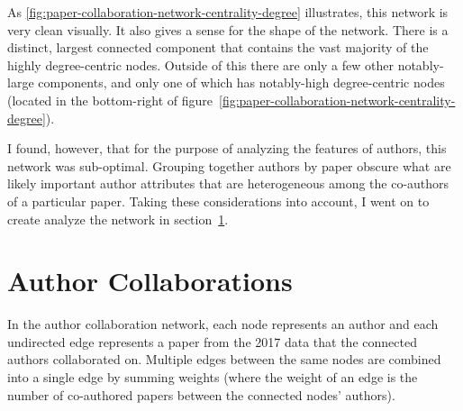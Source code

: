 \documentclass{article}
\begin{document}
As \ref{fig:paper-collaboration-network-centrality-degree} illustrates, this network is very clean visually.
It also gives a sense for the shape of the network.
There is a distinct, largest connected component that contains the vast majority of the highly degree-centric nodes.
Outside of this there are only a few other notably-large components, and only one of which has notably-high degree-centric nodes (located in the bottom-right of figure~\ref{fig:paper-collaboration-network-centrality-degree}).

I found, however, that for the purpose of analyzing the features of authors, this network was sub-optimal.
Grouping together authors by paper obscure what are likely important author attributes that are heterogeneous among the co-authors of a particular paper. Taking these considerations into account, I went on to create analyze the network in section~\ref{sec:author-collaboration}.

\section{Author Collaborations}
\label{sec:author-collaboration}

In the author collaboration network, each node represents an author and each undirected edge represents a paper from the 2017 data that the connected authors collaborated on.
Multiple edges between the same nodes are combined into a single edge by summing weights (where the weight of an edge is the number of co-authored papers between the connected nodes' authors).
\end{document}
